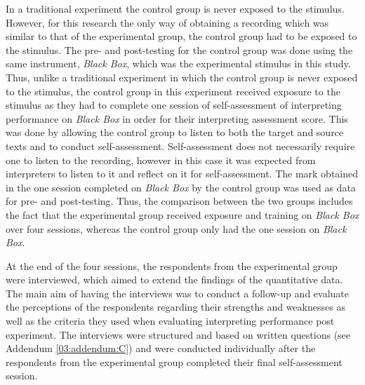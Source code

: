 \documentclass[output=paper]{langsci/langscibook}
\begin{document}
In a traditional experiment the control group is never exposed to the stimulus. However, for this research the only way of obtaining a recording which was similar to that of the experimental group, the control group had to be exposed to the stimulus. The pre- and post-testing for the control group was done using the same instrument, \textit{Black Box}, which was the experimental stimulus in this study. Thus, unlike a traditional experiment in which the control group is never exposed to the stimulus, the control group in this experiment received exposure to the stimulus as they had to complete one session of self-assessment of interpreting performance on \textit{Black Box} in order for their interpreting assessment score. This was done by allowing the control group to listen to both the target and source texts and to conduct self-assessment. Self-assessment does not necessarily require one to listen to the recording, however in this case it was expected from interpreters to listen to it and reflect on it for self-assessment. The mark obtained in the one session completed on \textit{Black Box} by the control group was used as data for pre- and post-testing. Thus, the comparison between the two groups includes the fact that the experimental group received exposure and training on \textit{Black Box} over four sessions, whereas the control group only had the one session on \textit{Black Box}.

At the end of the four sessions, the respondents from the experimental group were interviewed, which aimed to extend the findings of the quantitative data. The main aim of having the interviews was to conduct a follow-up and evaluate the perceptions of the respondents regarding their strengths and weaknesses as well as the criteria they used when evaluating interpreting performance post experiment. The interviews were structured and based on written questions (see Addendum \ref{03:addendum:C}) and were conducted individually after the respondents from the experimental group completed their final self-assessment session.
\end{document}
